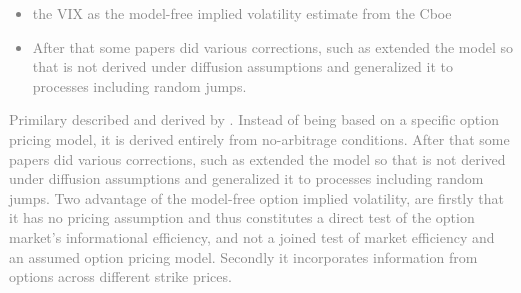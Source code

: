 \textcolor{gray}{
\begin{itemize}\itemsep0pt
\item the VIX as the model-free implied volatility estimate from the Cboe 
\item After that some papers did various corrections, such as \citeauthor{jiang2005} extended the model so that is not derived under diffusion assumptions and generalized it to processes including random jumps. 
\end{itemize}
}

\textcolor{gray}{
Primilary described and derived by \citeauthor{britten2000}. Instead of being based on a specific option pricing model, it is derived entirely from no-arbitrage conditions. After that some papers did various corrections, such as \citeauthor{jiang2003} extended the model so that is not derived under diffusion assumptions and generalized it to processes including random jumps. Two advantage of the model-free option implied volatility, are firstly that it has no pricing assumption and thus constitutes a direct test of the option market's informational efficiency, and not a joined test of market efficiency and an assumed option pricing model. Secondly it incorporates information from options across different strike prices. }
